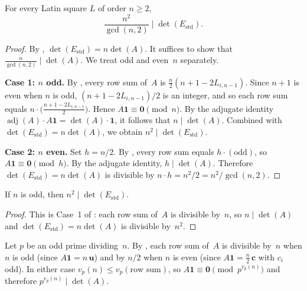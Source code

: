 \documentclass[11pt,a4paper]{article}
\newcommand{\one}{\mathbf{1}}
\newcommand{\adj}{\operatorname{adj}}
\newcommand{\Estd}{E_{\mathrm{std}}}
\begin{document}
\begin{theorem}\label{thm:unified}
For every Latin square $L$ of order $n\ge 2$,
\[
  \frac{n^2}{\gcd(n,2)} \;\Big|\; \det(\Estd).
\]
\end{theorem}

\begin{proof}
By , $\det(\Estd)=n\det(A)$.  It suffices to show that
$\frac{n}{\gcd(n,2)}\mid\det(A)$.  We treat odd and even~$n$ separately.

\medskip\noindent\textbf{Case 1: $n$ odd.}  By , every
row sum of~$A$ is $\frac{n}{2}(n+1-2L_{i,n-1})$.  Since $n+1$ is even
when $n$ is odd, $(n+1-2L_{i,n-1})/2$ is an integer, and so each row
sum equals $n\cdot\bigl(\frac{n+1-2L_{i,n-1}}{2}\bigr)$.  Hence
$A\one\equiv\mathbf{0}\pmod{n}$.  By the adjugate identity
$\adj(A)\cdot A\one = \det(A)\cdot\one$, it follows that
$n\mid\det(A)$.  Combined with $\det(\Estd)=n\det(A)$, we obtain
$n^2\mid\det(\Estd)$.

\medskip\noindent\textbf{Case 2: $n$ even.}  Set $h=n/2$.  By
, every row sum equals $h\cdot(\text{odd})$, so
$A\one\equiv\mathbf{0}\pmod{h}$.  By the adjugate identity,
$h\mid\det(A)$.  Therefore $\det(\Estd)=n\det(A)$ is divisible by
$n\cdot h = n^2/2 = n^2/\gcd(n,2)$.
\end{proof}

\begin{corollary}\label{cor:odd}
If $n$ is odd, then $n^2\mid\det(\Estd)$.
\end{corollary}

\begin{proof}
This is Case~1 of : each row sum of~$A$ is divisible
by~$n$, so $n\mid\det(A)$ and $\det(\Estd)=n\det(A)$ is divisible by~$n^2$.
\end{proof}

\begin{remark}\label{rem:prime}
Let $p$ be an odd prime dividing~$n$.  By ,
each row sum of~$A$ is divisible by~$n$ when $n$ is odd
(since $A\one=n\,\mathbf{u}$) and by $n/2$ when $n$ is even
(since $A\one=\frac{n}{2}\,\mathbf{c}$ with $c_i$ odd).
In either case $v_p(n)\le v_p(\text{row sum})$, so
$A\one\equiv\mathbf{0}\pmod{p^{v_p(n)}}$ and therefore
$p^{v_p(n)}\mid\det(A)$.
\end{remark}
\end{document}
